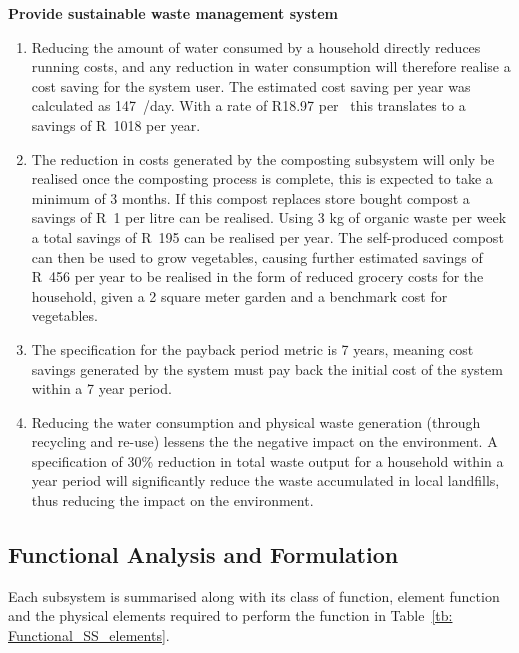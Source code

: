 \documentclass[a4paper,11pt,fleqn]{report}
\begin{document}
\noindent\textbf{Provide sustainable waste management system}
\begin{enumerate}
\item Reducing the amount of water consumed by a household directly reduces running costs, and any reduction in water consumption will therefore realise a cost saving for the system user. The estimated cost saving per year was calculated as 147~/day. With a rate of R18.97 per~ this translates to a savings of R~1018 per year.
\item The reduction in costs generated by the composting subsystem will only be realised once the composting process is complete, this is expected to take a minimum of 3 months. If this compost replaces store bought compost a savings of R~1 per litre can be realised. Using 3 kg of organic waste per week a total savings of R~195 can be realised per year. The self-produced compost can then be used to grow vegetables, causing further estimated savings of R~456 per year to be realised in the form of reduced grocery costs for the household, given a 2 square meter garden and a benchmark cost for vegetables.
\item The specification for the payback period metric is 7 years, meaning cost savings generated by the system must pay back the initial cost of the system within a  7 year period.
\item Reducing the water consumption and physical waste generation (through recycling and re-use) lessens the the negative impact on the environment. A specification of 30\% reduction in total waste output for a household within a year period will significantly reduce the waste accumulated in local landfills, thus reducing the impact on the environment.
\end{enumerate}

\subsection{Functional Analysis and Formulation} 
Each subsystem is summarised along with its class of function, element function and the physical elements required to perform the function in Table~\ref{tb: Functional_SS_elements}.\\
\end{document}
